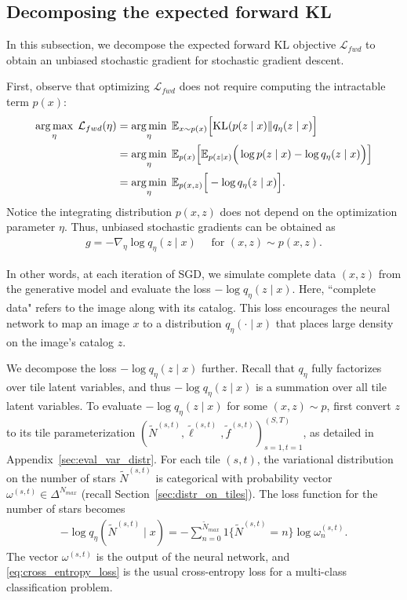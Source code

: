 \subsection{Decomposing the expected forward KL}
\label{sec:sleep_details}
In this subsection, we decompose the expected forward KL objective $\mathcal{L}_{fwd}$ 
to obtain an unbiased stochastic gradient for stochastic gradient descent. 

First, observe that optimizing $\mathcal{L}_{fwd}$ does not require computing the intractable term $p(x)$:
\begin{align}
\operatorname*{arg\,max}_\eta\; \mathcal{L}_{fwd}(\eta)
    & = \operatorname*{arg\,min}_{\eta} \; \mathbb{E}_{x \sim p(x)}\Big[ \mathrm{KL}(p(z \mid x) \| q_\eta(z \mid x)\Big] \\
  &=\operatorname*{arg\,min}_{\eta} \; \mathbb E_{p(x)}\Big[\mathbb E_{p(z \mid x)}\Big(\log p(z \mid x) - \log q_\eta(z \mid x) \Big)\Big]\\
&=\operatorname*{arg\,min}_{\eta} \; \mathbb E_{p(x, z)}\Big[- \log q_\eta(z \mid x) \Big]\label{eq:sleep_loss_simple}.
\end{align}
Notice the integrating distribution $p(x,z)$ does not depend on the optimization parameter $\eta$.
Thus, unbiased stochastic gradients can be obtained as
\begin{align}
    g = -\nabla_\eta \log q_\eta(z \mid x) \quad \text{ for } (x, z)\sim p(x, z).
\end{align}

In other words, at each iteration of SGD, we simulate complete data $(x,z)$ from the generative model and evaluate the loss $-\log q_\eta(z \mid x)$.
Here, ``complete data" refers to the image along with its catalog.
This loss encourages the neural network to map an image $x$ to a distribution $q_{\eta}(\cdot \mid x)$ that places large density on the image's catalog $z$.

We decompose the loss $-\log q_\eta(z \mid x)$ further.
Recall that $q_\eta$ fully factorizes over tile latent variables, and thus $-\log q_\eta(z \mid x)$ is a summation over all tile latent variables.
To evaluate $-\log q_\eta(z \mid x)$ for some $(x,z)\sim p$, first convert $z$ to its tile parameterization $(\tilde N^{(s,t)}, \tilde \ell^{(s,t)}, \tilde f^{(s,t)})_{s=1,t=1}^{(S,T)}$, as detailed in Appendix~\ref{sec:eval_var_distr}.
For each tile $(s,t)$, the variational distribution on the number of stars $\tilde N^{(s,t)}$ is categorical with probability vector $\omega^{(s,t)}\in\Delta^{N_{max}}$ (recall Section~\ref{sec:distr_on_tiles}).
The loss function for the number of stars becomes
\begin{align}
    - \log q_\eta(\tilde N^{(s,t)} \mid x) = -\sum_{n = 0}^{\tilde N_{max}} 1\{\tilde N^{(s,t)} = n\} \log \omega^{(s,t)}_n.
    \label{eq:cross_entropy_loss}
\end{align}
The vector $\omega^{(s,t)}$ is the output of the neural network, and \eqref{eq:cross_entropy_loss} is the usual cross-entropy loss for a multi-class classification problem.

